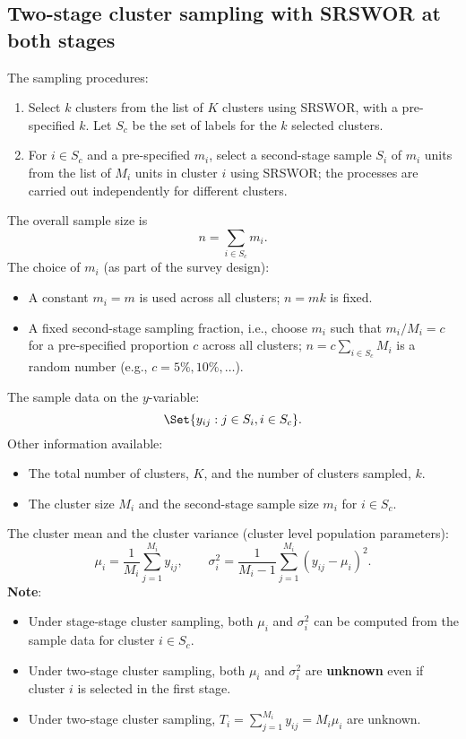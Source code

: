 \subsection{Two-stage cluster sampling with SRSWOR at both stages}
The sampling procedures:
\begin{enumerate}
      \item Select $k$ clusters from the list of $K$ clusters using SRSWOR, with
            a pre-specified $k$. Let $ S_c $ be the set of labels for the $k$ selected
            clusters.
      \item For $ i\in S_c $ and a pre-specified $ m_i $, select a second-stage sample $ S_i $
            of $ m_i $ units from the list of $ M_i $ units in cluster $i$ using SRSWOR\@;
            the processes are carried out independently for different clusters.
\end{enumerate}

The overall sample size is
\[ n=\sum_{i\in S_c}m_i. \]
The choice of $ m_i $ (as part of the survey design):
\begin{itemize}
      \item A constant $ m_i=m $ is used across all clusters; $ n=mk $ is fixed.
      \item A fixed second-stage sampling fraction, i.e., choose $ m_i $ such that
            $ m_i/M_i=c $ for a pre-specified proportion $ c $ across all clusters;
            $ n=c\sum_{i\in S_c}M_i $ is a random number (e.g., $ c=5\%,10\%,\ldots$).
\end{itemize}
The sample data on the $ y $-variable:
\[ \Set{y_{ij}:j\in S_i,i\in S_c}. \]
Other information available:
\begin{itemize}
      \item The total number of clusters, $K$, and the number of clusters
            sampled, $k$.
      \item The cluster size $ M_i $ and the second-stage sample size $ m_i $ for
            $ i\in S_c $.
\end{itemize}

The cluster mean and the cluster variance (cluster level population
parameters):
\[ \mu_i=\frac{1}{M_i}\sum_{j=1}^{M_i}y_{ij},\qquad \sigma_i^2=\frac{1}{M_i-1}\sum_{j=1}^{M_i}(y_{ij}-\mu_i)^2. \]
\textbf{Note}:
\begin{itemize}
      \item Under stage-stage cluster sampling, both $ \mu_i $ and $ \sigma_i^2 $ can be computed from the sample data for cluster
            $ i\in S_c $.
      \item Under two-stage cluster sampling, both $ \mu_i $ and $ \sigma_i^2 $ are \textbf{unknown} even if cluster
            $ i $ is selected in the first stage.
      \item Under two-stage cluster sampling, $ T_i=\sum_{j=1}^{M_i}y_{ij}=M_i\mu_i $ are unknown.
\end{itemize}

